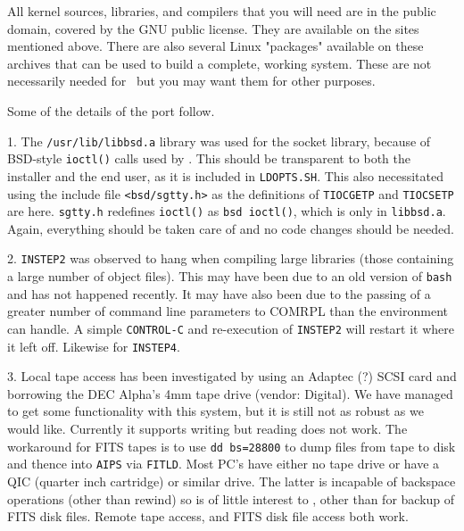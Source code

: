 {\noindent
All kernel sources, libraries, and compilers that you will need are in the
public domain, covered by the GNU public license.  They are available on
the sites mentioned above.  There are also several Linux "packages"
available on these archives that can be used to build a complete, working
system.  These are not necessarily needed for \AIPS\ but you may want them
for other purposes.

Some of the details of the port follow.

\item{1.} The {\tt /usr/lib/libbsd.a} library was used for the socket
        library, because of BSD-style {\tt ioctl()} calls used by \AIPS.
        This should be transparent to both the installer and the end user,
        as it is included in {\tt LDOPTS.SH}.  This also necessitated
        using the include file {\tt <bsd/sgtty.h>} as the definitions of
        {\tt TIOCGETP} and {\tt TIOCSETP} are here.  {\tt sgtty.h}
        redefines {\tt ioctl()} as {\tt bsd ioctl()}, which is only in
        {\tt libbsd.a}.  Again, everything should be taken care of and no
        code changes should be needed.

\item{2.} {\tt INSTEP2} was observed to hang when compiling large
        libraries (those containing a large number of object files).  This
        may have been due to an old version of {\tt bash} and has not
        happened recently.  It may have also been due to the passing of a
        greater number of command line parameters to COMRPL than the
        environment can handle.  A simple {\tt CONTROL-C} and re-execution
        of {\tt INSTEP2} will restart it where it left off.  Likewise for
        {\tt INSTEP4}.

\item{3.} Local tape access has been investigated by using an Adaptec (?)
        SCSI card and borrowing the DEC Alpha's 4mm tape drive (vendor:
        Digital).  We have managed to get some functionality with this
        system, but it is still not as robust as we would like.  Currently
        it supports writing but reading does not work.  The workaround for
        FITS tapes is to use {\tt dd bs=28800} to dump files from tape to
        disk and thence into {\tt AIPS} via {\tt FITLD}.
        Most PC's have either no tape drive or have a QIC (quarter inch
        cartridge) or similar drive.  The latter is incapable of backspace
        operations (other than rewind) so is of little interest to \AIPS,
        other than for backup of FITS disk files.
        Remote tape access, and FITS disk file access both work.

}
